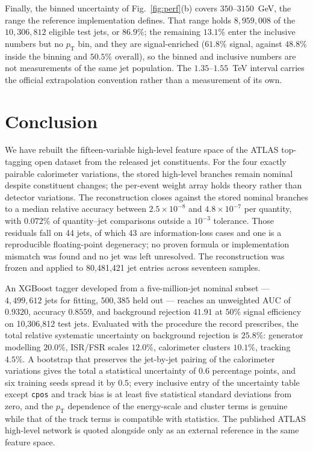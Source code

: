 \documentclass[pdflatex,sn-mathphys,Numbered,iicol]{sn-jnl}
\newcommand{\pt}{p_{\mathrm{T}}}
\begin{document}
Finally, the binned uncertainty of Fig.~\ref{fig:perf}(b) covers $350$--$3150$~GeV, the
range the reference implementation defines. That range holds $8{,}959{,}008$ of the
$10{,}306{,}812$ eligible test jets, or $86.9\%$; the remaining $13.1\%$ enter the
inclusive numbers but no $\pt$ bin, and they are signal-enriched ($61.8\%$ signal,
against $48.8\%$ inside the binning and $50.5\%$ overall), so the binned and inclusive
numbers are not measurements of the same jet population. The $1.35$--$1.55$~TeV
interval carries the official extrapolation convention rather than a measurement of
its own.

\section{Conclusion}
\label{sec:conclusion}

We have rebuilt the fifteen-variable high-level feature space of the ATLAS top-tagging
open dataset from the released jet constituents. For the four exactly pairable
calorimeter variations, the stored high-level branches remain nominal despite
constituent changes; the per-event weight array holds theory rather than detector
variations. The
reconstruction closes against the stored nominal branches to a median relative accuracy
between $2.5\times10^{-8}$ and $4.8\times10^{-7}$ per quantity, with $0.072\%$ of
quantity--jet comparisons outside a $10^{-3}$ tolerance. Those residuals fall on 44
jets, of which 43 are information-loss cases and one is a reproducible floating-point
degeneracy; no proven formula or implementation mismatch was found and no jet was left
unresolved. The reconstruction was frozen and applied to 80{,}481{,}421 jet entries
across seventeen samples.

An XGBoost tagger developed from a five-million-jet nominal subset --- $4{,}499{,}612$
jets for fitting, $500{,}385$ held out --- reaches an unweighted AUC of $0.9320$,
accuracy $0.8559$, and background rejection $41.91$ at $50\%$ signal efficiency on
10{,}306{,}812 test jets. Evaluated with the procedure the record prescribes, the total
relative systematic uncertainty on background rejection is $25.8\%$: generator
modelling $20.0\%$, ISR/FSR scales $12.0\%$, calorimeter clusters $10.1\%$, tracking
$4.5\%$. A bootstrap that preserves the jet-by-jet pairing of the calorimeter
variations gives the total a statistical uncertainty of $0.6$ percentage points, and six
training seeds spread it by $0.5$; every inclusive entry of the uncertainty table except \texttt{cpos}
and track bias is at least five statistical standard deviations from zero, and the $\pt$ dependence of
the energy-scale and cluster terms is genuine while that of the track terms is compatible
with statistics. The published ATLAS high-level network is quoted alongside only as an
external reference in the same feature space.
\end{document}
